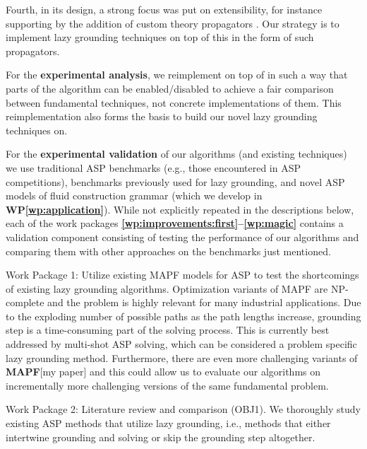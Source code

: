 \documentclass[a4paper,11pt]{article}
\newcommand{\alphasolver}{\logicname{alpha}}
\newcommand{\wasp}{\logicname{wasp}}
\newcommand\WPref[1]{\textbf{WP\ref{#1}}}
\def\mapf{{\bf MAPF}\xspace}
\begin{document}
Fourth, in its design, a strong focus was put on extensibility, for instance supporting by the addition of custom theory propagators \cite{aiia/DodaroRS16}.
Our strategy is to implement lazy grounding techniques on top of this in the form of such propagators. 

For the \textbf{experimental analysis}, we reimplement \alphasolver on top of \wasp in such a way that parts of the algorithm can be enabled/disabled to achieve a fair comparison between fundamental techniques, not concrete implementations of them. This reimplementation  also forms the basis to build our novel lazy grounding techniques on. 

For the \textbf{experimental validation} of our algorithms (and existing techniques) we use traditional ASP benchmarks (e.g., those encountered in ASP competitions), benchmarks previously used for lazy grounding, and novel ASP models of fluid construction grammar (which we develop in \WPref{wp:application}). 
While not explicitly repeated in the descriptions below, each of the work packages \textbf{\ref{wp:improvements:first}--\ref{wp:magic}} contains a validation component consisting of testing the performance of our algorithms and comparing them with other approaches on the benchmarks just mentioned.


\begin{WP}Work Package 1: Utilize existing MAPF models for ASP to test the shortcomings of existing lazy grounding algorithms. Optimization variants of MAPF are NP-complete and the problem is highly relevant for many industrial applications. Due to the exploding number of possible paths as the path lengths increase, grounding step is a time-consuming part of the solving process. This is currently best addressed by multi-shot ASP solving, which can be considered a problem specific lazy grounding method. Furthermore, there are even more challenging variants of \mapf [my paper] and this could allow us to evaluate our algorithms on incrementally more challenging versions of the same fundamental problem.
\end{WP}

\begin{WP}Work Package 2: Literature review and comparison (OBJ1). We thoroughly study existing ASP methods that utilize lazy grounding, i.e., methods that either intertwine grounding and solving or skip the grounding step altogether. 
\end{WP}
\end{document}

